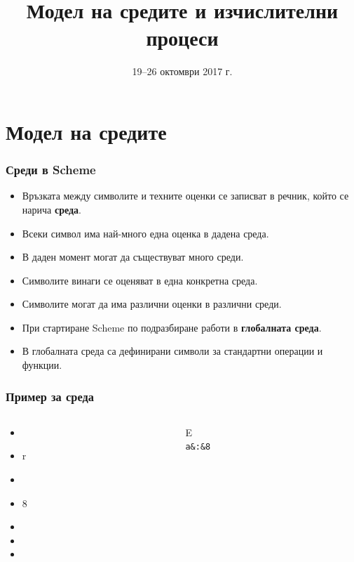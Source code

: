 \documentclass{beamer}
\title[Среди и процеси]{Модел на средите и изчислителни процеси}
\date{19--26 октомври 2017 г.}
\begin{document}
\begin{frame}
  \titlepage
\end{frame}

\section{Модел на средите}

\begin{frame}
  \frametitle{Среди в Scheme}

  \begin{itemize}[<+->]
  \item Връзката между символите и техните оценки се записват в речник, който се нарича \textbf{среда}.
  \item Всеки символ има най-много една оценка в дадена среда.
  \item В даден момент могат да съществуват много среди.
  \item Символите винаги се оценяват в една конкретна среда.
  \item \alert{Символите могат да има различни оценки в различни среди.}
  \item При стартиране Scheme по подразбиране работи в \textbf{глобалната среда}.
  \item В глобалната среда са дефинирани символи за стандартни операции и функции.
  \end{itemize}
\end{frame}

\begin{frame}
  \frametitle{Пример за среда}

  \begin{columns}[T,onlytextwidth]
    \begin{column}{.5\textwidth}
      \begin{itemize}[<+->]
      \item {}
      \item \evalstoerr r
      \item {}
      \item {}8
      \item {}
      \item {}
      \item {}
      \end{itemize}
    \end{column}

    \begin{column}{.5\textwidth}
      \begin{envir}{E}
        \\\firstinenv \tt a&:&8
      \end{envir}
    \end{column}
  \end{columns}
\end{frame}
\end{document}

